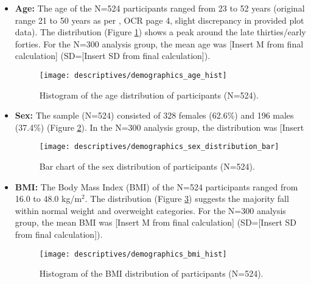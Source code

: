 \documentclass[11pt, a4paper]{report}
\newcommand{\jsoncite}[1]{\href{run:./data/#1.json}{\texttt{\detokenize{#1.json}}}}
\newcommand{\plotlink}[1]{\href{run:./plots/#1}{(See file)}} %
\begin{document}
\begin{itemize}
    \item \textbf{Age:} The age of the N=524 participants ranged from 23 to 52 years (original range 21 to 50 years as per \cite{ThesisTempPDF}, OCR page 4, slight discrepancy in provided plot data). The distribution (Figure \ref{fig:hist_age_results}) shows a peak around the late thirties/early forties. For the N=300 analysis group, the mean age was [Insert M from final calculation] (SD=[Insert SD from final calculation]).
    \begin{figure}[H]
        \centering
        \texttt{[image: descriptives/demographics\_age\_hist]}
        \caption{Histogram of the age distribution of participants (N=524).}
        \label{fig:hist_age_results}
    \end{figure}

    \item \textbf{Sex:} The sample (N=524) consisted of 328 females (62.6\%) and 196 males (37.4\%) (Figure \ref{fig:bar_sex_results}). In the N=300 analysis group, the distribution was [Insert %
    \begin{figure}[H]
        \centering
        \texttt{[image: descriptives/demographics\_sex\_distribution\_bar]}
        \caption{Bar chart of the sex distribution of participants (N=524).}
        \label{fig:bar_sex_results}
    \end{figure}

    \item \textbf{BMI:} The Body Mass Index (BMI) of the N=524 participants ranged from 16.0 to 48.0 kg/m$^2$. The distribution (Figure \ref{fig:hist_bmi_results}) suggests the majority fall within normal weight and overweight categories. For the N=300 analysis group, the mean BMI was [Insert M from final calculation] (SD=[Insert SD from final calculation]).
    \begin{figure}[H]
        \centering
        \texttt{[image: descriptives/demographics\_bmi\_hist]}
        \caption{Histogram of the BMI distribution of participants (N=524).}
        \label{fig:hist_bmi_results}
    \end{figure}


\end{itemize}
\end{document}
